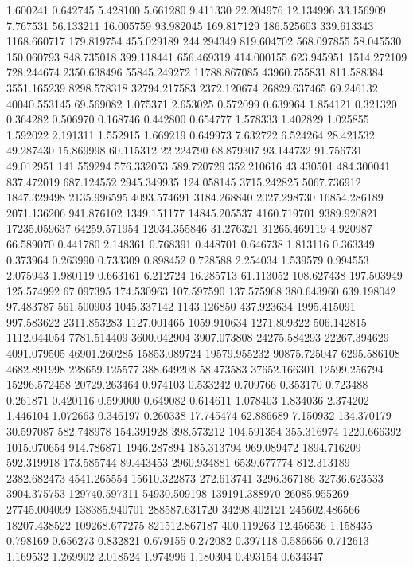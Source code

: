 1.600241
0.642745
5.428100
5.661280
9.411330
22.204976
12.134996
33.156909
7.767531
56.133211
16.005759
93.982045
169.817129
186.525603
339.613343
1168.660717
179.819754
455.029189
244.294349
819.604702
568.097855
58.045530
150.060793
848.735018
399.118441
656.469319
414.000155
623.945951
1514.272109
728.244674
2350.638496
55845.249272
11788.867085
43960.755831
811.588384
3551.165239
8298.578318
32794.217583
2372.120674
26829.637465
69.246132
40040.553145
69.569082
1.075371
2.653025
0.572099
0.639964
1.854121
0.321320
0.364282
0.506970
0.168746
0.442800
0.654777
1.578333
1.402829
1.025855
1.592022
2.191311
1.552915
1.669219
0.649973
7.632722
6.524264
28.421532
49.287430
15.869998
60.115312
22.224790
68.879307
93.144732
91.756731
49.012951
141.559294
576.332053
589.720729
352.210616
43.430501
484.300041
837.472019
687.124552
2945.349935
124.058145
3715.242825
5067.736912
1847.329498
2135.996595
4093.574691
3184.268840
2027.298730
16854.286189
2071.136206
941.876102
1349.151177
14845.205537
4160.719701
9389.920821
17235.059637
64259.571954
12034.355846
31.276321
31265.469119
4.920987
66.589070
0.441780
2.148361
0.768391
0.448701
0.646738
1.813116
0.363349
0.373964
0.263990
0.733309
0.898452
0.728588
2.254034
1.539579
0.994553
2.075943
1.980119
0.663161
6.212724
16.285713
61.113052
108.627438
197.503949
125.574992
67.097395
174.530963
107.597590
137.575968
380.643960
639.198042
97.483787
561.500903
1045.337142
1143.126850
437.923634
1995.415091
997.583622
2311.853283
1127.001465
1059.910634
1271.809322
506.142815
1112.044054
7781.514409
3600.042904
3907.073808
24275.584293
22267.394629
4091.079505
46901.260285
15853.089724
19579.955232
90875.725047
6295.586108
4682.891998
228659.125577
388.649208
58.473583
37652.166301
12599.256794
15296.572458
20729.263464
0.974103
0.533242
0.709766
0.353170
0.723488
0.261871
0.420116
0.599000
0.649082
0.614611
1.078403
1.834036
2.374202
1.446104
1.072663
0.346197
0.260338
17.745474
62.886689
7.150932
134.370179
30.597087
582.748978
154.391928
398.573212
104.591354
355.316974
1220.666392
1015.070654
914.786871
1946.287894
185.313794
969.089472
1894.716209
592.319918
173.585744
89.443453
2960.934881
6539.677774
812.313189
2382.682473
4541.265554
15610.322873
272.613741
3296.367186
32736.623533
3904.375753
129740.597311
54930.509198
139191.388970
26085.955269
27745.004099
138385.940701
288587.631720
34298.402121
245602.486566
18207.438522
109268.677275
821512.867187
400.119263
12.456536
1.158435
0.798169
0.656273
0.832821
0.679155
0.272082
0.397118
0.586656
0.712613
1.169532
1.269902
2.018524
1.974996
1.180304
0.493154
0.634347
